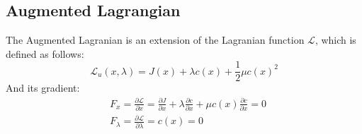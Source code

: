 \subsection{Augmented Lagrangian}
The Augmented Lagranian is an extension of the Lagranian function $ \mathcal{L} $, which is defined as follows:
\begin{equation}\label{eq:aug_lagraninan}
\mathcal{L}_u(x,\lambda)=J(x)+\lambda c(x)+\frac{1}{2}\mu c(x)^2
\end{equation}
And its gradient:
\begin{eqnarray}
&	F_x=\frac{\partial \mathcal{L}}{\partial x}=\frac{\partial J}{\partial x}+\lambda\frac{\partial c}{\partial x}+\mu c(x)\frac{\partial c}{\partial x}=0\\
&	F_{\lambda}=\frac{\partial \mathcal{L}}{\partial \lambda}=c(x)=0
\end{eqnarray}

